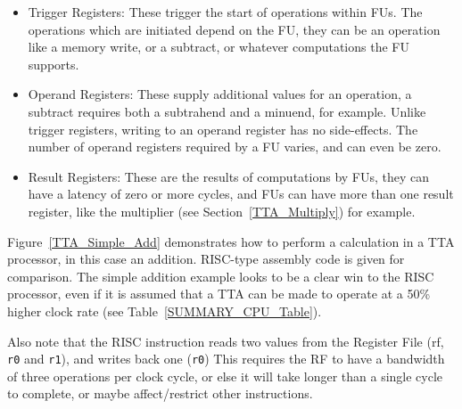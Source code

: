 \begin{itemize}
  \item Trigger Registers: These trigger the start of operations within FUs.
  The operations which are initiated depend on the FU, they can be an
  operation like a memory write, or a subtract, or whatever computations the FU
  supports.
  \item Operand Registers: These supply additional values for an operation, a
  subtract requires both a subtrahend and a minuend, for example. Unlike
  trigger registers, writing to an operand register has no side-effects. The
  number of operand registers required by a FU varies, and can even be zero.
  \item Result Registers: These are the results of computations by FUs, they
  can have a latency of zero or more cycles, and FUs can have more than one
  result register, like the multiplier (see Section~\ref{TTA_Multiply}) for
  example.
\end{itemize}

Figure~\ref{TTA_Simple_Add} demonstrates how to perform a calculation in a TTA
processor, in this case an addition. RISC-type assembly code is given for
comparison. The simple addition example looks to be a clear win to the RISC
processor, even if it is assumed that a TTA can be made to operate at a 50\%
higher clock rate (see Table~\ref{SUMMARY_CPU_Table}).

Also note that the RISC instruction reads two values from the Register
File (\gls{rf}, \texttt{r0} and
\texttt{r1}), and writes back one (\texttt{r0}) This requires the RF to have a
bandwidth of three operations per clock cycle, or else it will take longer than a
single cycle to complete, or maybe affect/restrict other instructions.

